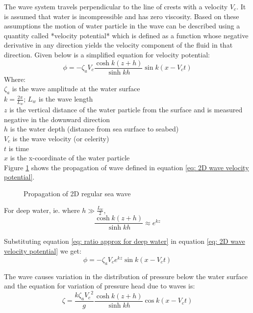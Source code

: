 The wave system travels perpendicular to the line of crests with a velocity
$V_c$. It is assumed that water is incompressible and has zero viscosity. Based
on these assumptions the motion of water particle in the wave can be described
using a quantity called *velocity potential* which is defined as a function
whose negative derivative in any direction yields the velocity component of the
fluid in that direction. Given
below is a simplified equation for velocity potential:
\begin{equation}
  \phi = - \zeta_a V_c \frac{\cosh k(z + h)}{\sinh k h} \sin k(x - V_c t)
  \label {eq: 2D wave velocity potential}
\end{equation}
Where: \\ 
$\zeta_a$ is the wave amplitude at the water surface\\ 
$k = \frac{2 \pi}{L_w}$; $L_w$ is the wave length\\ 
$z$ is the vertical distance of the water particle from the surface and is 
measured negative in the downward direction\\ 
$h$ is the water depth (distance from sea surface to seabed)\\ 
$V_c$ is the wave velocity (or celerity)\\ 
$t$ is time\\ 
$x$ is the x-coordinate of the water particle\\
Figure \ref{fig: RegularWave-1} shows the propagation of wave defined in 
equation \ref{eq: 2D wave velocity potential}.
\begin{figure} 
  \caption{Propagation of 2D regular sea wave} 
  \label{fig: RegularWave-1} 
\end{figure}

For deep water, ie. where $h \gg \frac{L_w}{2}$, 
\begin{equation}
  \frac{\cosh k(z + h)}{\sinh k h} \approx e^{k z}
  \label{eq: ratio approx for deep water}
\end{equation}

Substituting equation \ref{eq: ratio approx for deep water} in equation 
\ref{eq: 2D wave velocity potential} we get:
\begin{equation}
  \phi = - \zeta_a V_c e^{k z} \sin k(x - V_c t)
  \label{eq: 2D wave velocity potential for deep water}
\end{equation}

The wave causes variation in the distribution of pressure below the water
surface and the equation for variation of pressure head due to waves is:
\begin{equation}
  \zeta = \frac{k \zeta_a {V_c}^2}{g} \frac{\cosh k(z + h)}{\sinh k h} \cos k(x
  - V_c t)
  \label{eq: pressure head variation}
\end{equation}

